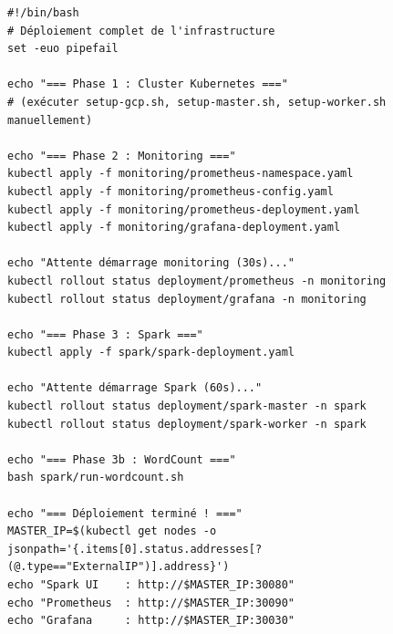 \documentclass[12pt,a4paper,french]{report}
\begin{document}
\begin{lstlisting}[style=bash, caption={Déploiement complet en une commande}]
#!/bin/bash
# Déploiement complet de l'infrastructure
set -euo pipefail

echo "=== Phase 1 : Cluster Kubernetes ==="
# (exécuter setup-gcp.sh, setup-master.sh, setup-worker.sh manuellement)

echo "=== Phase 2 : Monitoring ==="
kubectl apply -f monitoring/prometheus-namespace.yaml
kubectl apply -f monitoring/prometheus-config.yaml
kubectl apply -f monitoring/prometheus-deployment.yaml
kubectl apply -f monitoring/grafana-deployment.yaml

echo "Attente démarrage monitoring (30s)..."
kubectl rollout status deployment/prometheus -n monitoring
kubectl rollout status deployment/grafana -n monitoring

echo "=== Phase 3 : Spark ==="
kubectl apply -f spark/spark-deployment.yaml

echo "Attente démarrage Spark (60s)..."
kubectl rollout status deployment/spark-master -n spark
kubectl rollout status deployment/spark-worker -n spark

echo "=== Phase 3b : WordCount ==="
bash spark/run-wordcount.sh

echo "=== Déploiement terminé ! ==="
MASTER_IP=$(kubectl get nodes -o jsonpath='{.items[0].status.addresses[?(@.type=="ExternalIP")].address}')
echo "Spark UI    : http://$MASTER_IP:30080"
echo "Prometheus  : http://$MASTER_IP:30090"
echo "Grafana     : http://$MASTER_IP:30030"
\end{lstlisting}
\end{document}
